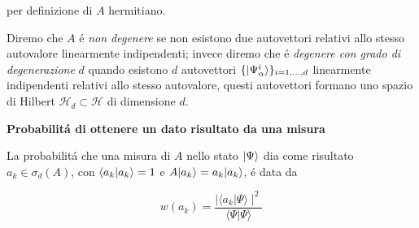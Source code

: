 per definizione di $A$ hermitiano.

Diremo che $A$ \'e \textit{non degenere} se non esistono due autovettori relativi allo stesso autovalore linearmente indipendenti; invece diremo che \'e \textit{degenere con grado di degenerazione} $d$ quando esistono $d$ autovettori $ \{ \ket{\Psi_\alpha^i} \}_{i=1, \ldots, d} $ linearmente indipendenti relativi allo stesso autovalore, questi autovettori formano uno spazio di Hilbert $\mathcal{H}_d \subset \mathcal{H}$
di dimensione $d$. 


\begin{postulato} \textbf{Probabilit\'a di ottenere un dato risultato da una misura}

La probabilit\'a che una misura di $A$ nello stato $\ket{\Psi}$ dia come risultato $a_k \in \sigma_d(A)$, con $\braket{a_k}{a_k} = 1$ e $A \ket{a_k} = a_k \ket{a_k}$, \'e data da

$$w(a_{k})={\frac{\mid\langle a_{k}|\Psi\rangle\mid^{2}}{\langle\Psi|\Psi\rangle}}$$
\end{postulato}

